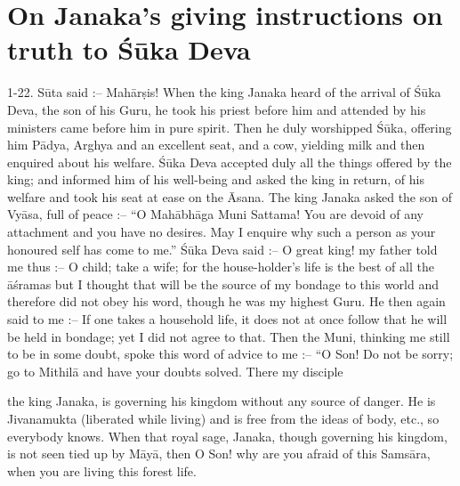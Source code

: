 \chapter{On Janaka's giving instructions on truth to \'S\=uka Deva}

1-22. S\=uta said :-- Mah\=ar\d{s}is! When the king Janaka heard of the arrival of \'S\=uka Deva, the son of his Guru, he took his priest before him and attended by his ministers came before him in pure spirit. Then he duly worshipped \'S\=uka, offering him P\=adya, Arghya and an excellent seat, and a cow, yielding milk and then enquired about his welfare. \'S\=uka Deva accepted duly all the things offered by the king; and informed him of his well-being and asked the king in return, of his welfare and took his seat at ease on the \=Asana. The king Janaka asked the son of Vy\=asa, full of peace :-- ``O Mah\=abh\=aga Muni Sattama! You are devoid of any attachment and you have no desires. May I enquire why such a person as your honoured self has come to me.'' \'S\=uka Deva said :-- O great king! my father told me thus :-- O child; take a wife; for the house-holder's life is the best of all the \=a\'sramas but I thought that will be the source of my bondage to this world and therefore did not obey his word, though he was my highest Guru. He then again said to me :-- If one takes a household life, it does not at once follow that he will be held in bondage; yet I did not agree to that. Then the Muni, thinking me still to be in some doubt, spoke this word of advice to me :-- ``O Son! Do not be sorry; go to Mithil\=a and have your doubts solved. There my disciple

the king Janaka, is governing his kingdom without any source of danger. He is Jivanamukta (liberated while living) and is free from the ideas of body, etc., so everybody knows. When that royal sage, Janaka, though governing his kingdom, is not seen tied up by M\=ay\=a, then O Son! why are you afraid of this Sams\=ara, when you are living this forest life.

